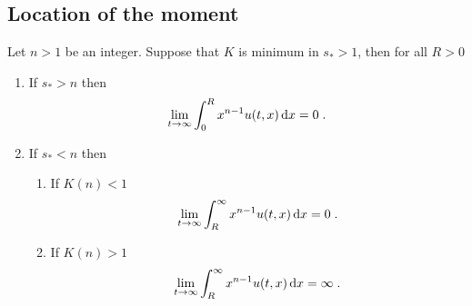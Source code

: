 \documentclass[11pt]{amsart}
\newcommand{\diff}{\,\mathrm{d}}
\begin{document}
\subsection{Location of the moment}

\begin{proposition} Let $n>1$ be an integer. Suppose that $K$ is minimum in $s_* > 1$, then for all $R > 0$
    \begin{enumerate}
        \item If $s_* > n$ then 
    \begin{align*}
        \lim_{t\to \infty} \int_0^R x^{n-1} u(t,x) \diff x = 0
        \eqfinp
    \end{align*}
        \item If $s_* < n$ then 
        \begin{enumerate}
            \item If $K(n) < 1$
            \begin{align*}
                \lim_{t\to \infty} \int_R^{\infty} x^{n-1} u(t,x) \diff x = 0
                \eqfinp
            \end{align*}
            \item If $K(n) > 1$
            \begin{align*}
                \lim_{t\to \infty} \int_R^{\infty} x^{n-1} u(t,x) \diff x = \infty
                \eqfinp
            \end{align*}
        \end{enumerate}
    \end{enumerate}
\end{proposition}
\end{document}
